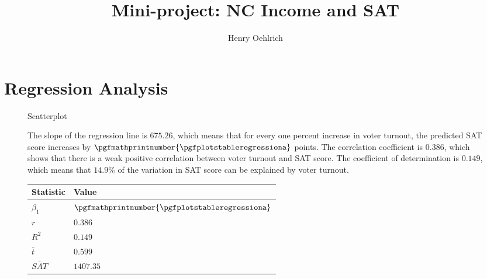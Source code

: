 \documentclass{article}
\title{Mini-project: NC Income and SAT}
\author{Henry Oehlrich}
\begin{document}
\maketitle

\section{Regression Analysis}

\begin{figure}[h]
    \centering
    \caption{Scatterplot}
    \label{fig:scatter}
\end{figure}

\begin{figure}[h]
    \begin{minipage}{0.7\textwidth}
        The slope of the regression line is $675.26$, which means that for
        every one percent increase in voter turnout, the predicted SAT score
        increases by $\pgfmathprintnumber{\pgfplotstableregressiona}$ points.
        The correlation coefficient is $0.386$, which shows that there is a
        weak positive correlation between voter turnout and SAT score. The
        coefficient of determination is $0.149$, which means that $14.9\%$ of
        the variation in SAT score can be explained by voter turnout.
    \end{minipage}%
    \hspace{0.05\textwidth}
    \begin{minipage}{0.2\textwidth}
        \centering
        \begin{tabular}{l|l}
            \toprule
            Statistic & Value \\
            \midrule
            $\beta_1$ & $\pgfmathprintnumber{\pgfplotstableregressiona}$ \\
            $r$ & $0.386$ \\
            $R^2$ & $0.149$ \\
            $\bar{t}$ & $0.599$ \\
            $\overline{SAT}$ & $1407.35$ \\
            \bottomrule
        \end{tabular}
    \end{minipage}
\end{figure}
\end{document}
